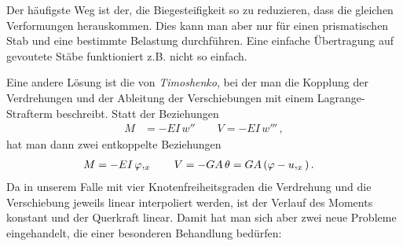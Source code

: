 Der h\"{a}ufigste Weg ist der, die Biegesteifigkeit so zu reduzieren, dass die gleichen Verformungen herauskommen. Dies kann man aber nur f\"{u}r einen prismatischen Stab und eine bestimmte Belastung durchf\"{u}hren. Eine einfache \"{U}bertragung auf gevoutete St\"{a}be funktioniert z.B. nicht so einfach.

Eine andere L\"{o}sung ist die von {\em Timoshenko\/}, bei der man die Kopplung der Verdrehungen und der Ableitung der Verschiebungen mit einem Lagrange-Strafterm beschreibt. Statt der Beziehungen
\begin{align}
M &= - EI\,w'' \qquad V = - EI\,w'''\,,
\end{align}
hat man dann zwei entkoppelte Beziehungen
\begin{align}
M &= - EI\,\varphi,_x  \qquad V = - GA\,\theta = GA\,(\varphi - u,_x)\,.
\end{align}
Da in unserem Falle mit vier Knotenfreiheitsgraden die Verdrehung und die Verschiebung jeweils linear interpoliert werden, ist der Verlauf des Moments konstant und der Querkraft linear. Damit hat man sich aber zwei neue Probleme eingehandelt, die einer besonderen Behandlung bed\"{u}rfen:\\

